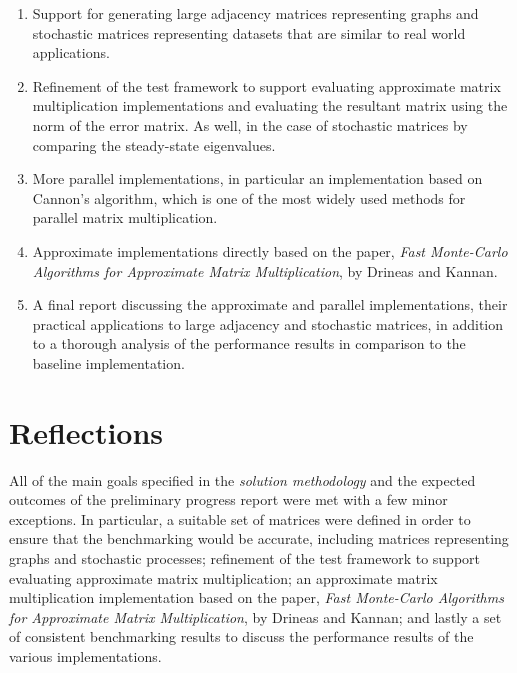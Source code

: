 \documentclass[oneside]{article}
\begin{document}
\begin{enumerate}
\item Support for generating large adjacency matrices representing graphs and stochastic matrices representing datasets that are similar to real world applications.

\item Refinement of the test framework to support evaluating approximate matrix multiplication implementations and evaluating the resultant matrix using the norm of the error matrix. As well, in the case of stochastic matrices by comparing the steady-state eigenvalues.

\item More parallel implementations, in particular an implementation based on Cannon's algorithm, which is one of the most widely used methods for parallel matrix multiplication.

\item Approximate implementations directly based on the paper, \emph{Fast Monte-Carlo Algorithms for Approximate Matrix Multiplication}\cite{drineas2001fast}, by Drineas and Kannan.

\item A final report discussing the approximate and parallel implementations, their practical applications to large adjacency and stochastic matrices, in addition to a thorough analysis of the performance results in comparison to the baseline implementation.

\end{enumerate}




\section{Reflections}

All of the main goals specified in the \emph{solution methodology} and the expected outcomes of the preliminary progress report were met with a few minor exceptions. In particular, a suitable set of matrices were defined in order to ensure that the benchmarking would be accurate, including matrices representing graphs and stochastic processes; refinement of the test framework to support evaluating approximate matrix multiplication; an approximate matrix multiplication implementation based on the paper, \emph{Fast Monte-Carlo Algorithms for Approximate Matrix Multiplication}\cite{drineas2001fast}, by Drineas and Kannan; and lastly a set of consistent benchmarking results to discuss the performance results of the various implementations.
\end{document}
